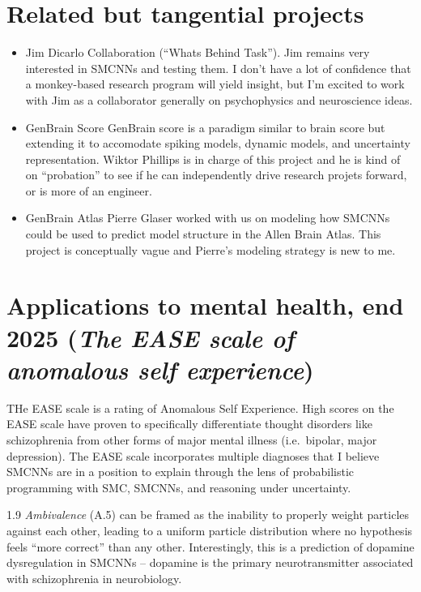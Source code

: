 \documentclass[
  letterpaper,
  DIV=11,
  numbers=noendperiod]{scrartcl}
\begin{document}
\section{Related but tangential
projects}\label{related-but-tangential-projects}

\begin{itemize}
\item
  Jim Dicarlo Collaboration (``Whats Behind Task''). Jim remains very
  interested in SMCNNs and testing them. I don't have a lot of
  confidence that a monkey-based research program will yield insight,
  but I'm excited to work with Jim as a collaborator generally on
  psychophysics and neuroscience ideas.
\item
  GenBrain Score GenBrain score is a paradigm similar to brain score but
  extending it to accomodate spiking models, dynamic models, and
  uncertainty representation. Wiktor Phillips is in charge of this
  project and he is kind of on ``probation'' to see if he can
  independently drive research projets forward, or is more of an
  engineer.
\item
  GenBrain Atlas Pierre Glaser worked with us on modeling how SMCNNs
  could be used to predict model structure in the Allen Brain Atlas.
  This project is conceptually vague and Pierre's modeling strategy is
  new to me.
\end{itemize}

\section{\texorpdfstring{Applications to mental health, end 2025
(\emph{The EASE scale of anomalous self
experience})}{Applications to mental health, end 2025 (The EASE scale of anomalous self experience)}}\label{applications-to-mental-health-end-2025-the-ease-scale-of-anomalous-self-experience}

THe EASE scale is a rating of Anomalous Self Experience. High scores on
the EASE scale have proven to specifically differentiate thought
disorders like schizophrenia from other forms of major mental illness
(i.e.~bipolar, major depression). The EASE scale incorporates multiple
diagnoses that I believe SMCNNs are in a position to explain through the
lens of probabilistic programming with SMC, SMCNNs, and reasoning under
uncertainty.

1.9 \emph{Ambivalence} (A.5) can be framed as the inability to properly
weight particles against each other, leading to a uniform particle
distribution where no hypothesis feels ``more correct'' than any other.
Interestingly, this is a prediction of dopamine dysregulation in SMCNNs
-- dopamine is the primary neurotransmitter associated with
schizophrenia in neurobiology.
\end{document}
